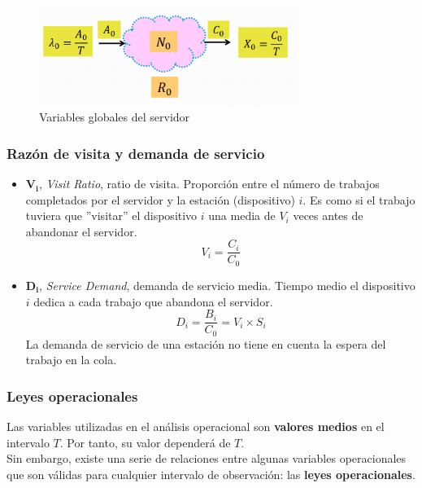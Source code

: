 \documentclass[12pt,spanish]{article}
\begin{document}
\begin{figure}[H]
	\centering
	\includegraphics[width=0.75\textwidth]{varserver.png}
	\caption{Variables globales del servidor}
\end{figure}

\subsubsection{Razón de visita y demanda de servicio}

\begin{itemize}
	\item $\pmb{V_i}$, \textit{Visit Ratio}, ratio de visita. Proporción entre el número de trabajos completados por el servidor y la estación (dispositivo) $i$. Es como si el trabajo tuviera que ''visitar'' el dispositivo $i$ una media de $V_i$ veces antes de abandonar el servidor.
		\begin{equation*}
			V_i=\frac{C_i}{C_0}
		\end{equation*}
	\item $\pmb{D_i}$, \textit{Service Demand}, demanda de servicio media. Tiempo medio el dispositivo $i$ dedica a cada trabajo que abandona el servidor.
		\begin{equation*}
			D_i=\frac{B_i}{C_0}=V_i \times S_i
		\end{equation*}
	La demanda de servicio de una estación no tiene en cuenta la espera del trabajo en la cola.
\end{itemize}

\subsubsection{Leyes operacionales}

Las variables utilizadas en el análisis operacional son \textbf{valores medios} en el intervalo $T$. Por tanto, su valor dependerá de $T$.\\

Sin embargo, existe una serie de relaciones entre algunas variables operacionales que son válidas para cualquier intervalo de observación: las \textbf{leyes operacionales}.\\
\end{document}
